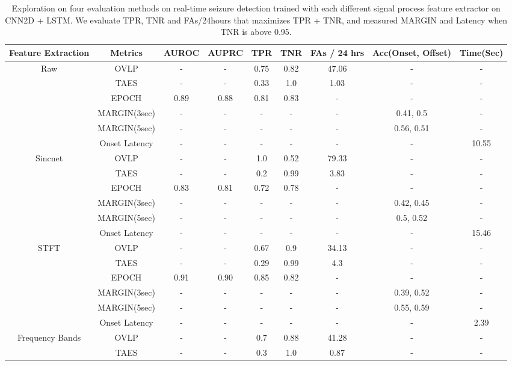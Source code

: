 \documentclass[pmlr,twocolumn,10pt]{jmlr}
\begin{document}
\begin{table*}[ht!]
	\footnotesize
	\centering
	\caption{Exploration on four evaluation methods on real-time seizure detection trained with each different signal process feature extractor on CNN2D + LSTM. We evaluate TPR, TNR and FAs/24hours that maximizes TPR + TNR, and measured MARGIN and Latency when TNR is above 0.95.}
	\label{eval_preproc_appendix}
	\begin{tabular}{c|c|ccccccc}
		\toprule
		Feature Extraction & Metrics & AUROC & AUPRC & TPR & TNR & FAs / 24 hrs & Acc(Onset, Offset) & Time(Sec)\\
		\midrule
		\multirow{6}{*}{Raw} 
		& OVLP & - & - & 0.75 & 0.82 & 47.06 & - & - \\
		& TAES & - & - & 0.33 & 1.0 & 1.03 & - & - \\
		& EPOCH & 0.89 & 0.88 & 0.81 & 0.83 & - & - & - \\
		& MARGIN(3sec)  & - & - & - & - & - & 0.41, 0.5 & - \\
		& MARGIN(5sec) & - & - & - & - & - & 0.56, 0.51 & - \\
		& Onset Latency & - & - & - & - & - & - & 10.55 \\
		\midrule
		\multirow{6}{*}{Sincnet}
		& OVLP & - & - & 1.0 & 0.52 & 79.33 & - & - \\
		& TAES & - & - & 0.2 & 0.99 & 3.83 & - & - \\
		& EPOCH & 0.83 & 0.81 & 0.72 & 0.78 & - & - & - \\
		& MARGIN(3sec)  & - & - & - & - & - & 0.42, 0.45 & - \\
		& MARGIN(5sec) & - & - & - & - & - & 0.5, 0.52 & - \\
		& Onset Latency & - & - & - & - & - & - & 15.46 \\
		\midrule
		\multirow{6}{*}{STFT} 
		& OVLP & - & - & 0.67 & 0.9 & 34.13 & - & - \\
		& TAES & - & - & 0.29 & 0.99 & 4.3 & - & - \\
		& EPOCH & 0.91 & 0.90 & 0.85 & 0.82 & - & - & - \\
		& MARGIN(3sec)  & - & - & - & - & - & 0.39, 0.52 & - \\
		& MARGIN(5sec) & - & - & - & - & - & 0.55, 0.59 & - \\
		& Onset Latency & - & - & - & - & - & - & 2.39 \\
		\midrule
		\multirow{6}{*}{Frequency Bands} 
		& OVLP & - & - & 0.7 & 0.88 & 41.28 & - & - \\
		& TAES & - & - & 0.3 & 1.0 & 0.87 & - & - \\

\end{tabular}
\end{table*}
\end{document}
